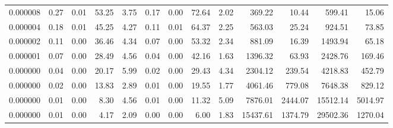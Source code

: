\begin{tabular}{lrrrrrrrrrrrr}
0.000008 & 0.27 & 0.01 & 53.25 & 3.75 & 0.17 & 0.00 & 72.64 & 2.02 & 369.22 & 10.44 & 599.41 & 15.06 \\
0.000004 & 0.18 & 0.01 & 45.25 & 4.27 & 0.11 & 0.01 & 64.37 & 2.25 & 563.03 & 25.24 & 924.51 & 73.85 \\
0.000002 & 0.11 & 0.00 & 36.46 & 4.34 & 0.07 & 0.00 & 53.32 & 2.34 & 881.09 & 16.39 & 1493.94 & 65.18 \\
0.000001 & 0.07 & 0.00 & 28.49 & 4.56 & 0.04 & 0.00 & 42.16 & 1.63 & 1396.32 & 63.93 & 2428.76 & 169.46 \\
0.000000 & 0.04 & 0.00 & 20.17 & 5.99 & 0.02 & 0.00 & 29.43 & 4.34 & 2304.12 & 239.54 & 4218.83 & 452.79 \\
0.000000 & 0.02 & 0.00 & 13.83 & 2.89 & 0.01 & 0.00 & 19.55 & 1.77 & 4061.46 & 779.08 & 7648.38 & 829.12 \\
0.000000 & 0.01 & 0.00 & 8.30 & 4.56 & 0.01 & 0.00 & 11.32 & 5.09 & 7876.01 & 2444.07 & 15512.14 & 5014.97 \\
0.000000 & 0.01 & 0.00 & 4.17 & 2.09 & 0.00 & 0.00 & 6.00 & 1.83 & 15437.61 & 1374.79 & 29502.36 & 1270.04 \\
\bottomrule
\end{tabular}
